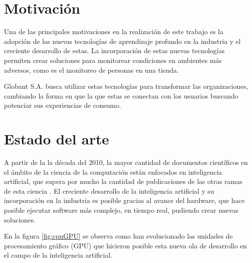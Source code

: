 

\section{Motivación}
\label{sec:motivacion}

Una de las principales motivaciones en la realización de este trabajo es la adopción de las nuevas tecnologías de aprendizaje profundo en la industria y el  creciente desarrollo de estas. La incorporación de estas nuevas tecnologías permiten crear soluciones para monitorear condiciones en ambientes más adversos, como es el monitoreo de personas en una tienda.

Globant S.A. busca utilizar estas tecnologías para transformar las organizaciones, cambiando la forma en que la que estas se conectan con los usuarios buscando potenciar sus experiencias de consumo.

\newpage


\section{Estado del arte}
\label{sec:estadoDelArte}

A partir de la la década del 2010, la mayor cantidad de documentos científicos en el ámbito de la ciencia de la computación están enfocados en inteligencia artificial, que supera por mucho la cantidad de publicaciones de las otras ramas de esta ciencia \citep{AI_PAPERS}. El creciente desarrollo de la inteligencia artificial y su incorporación en la industria es posible gracias al avance del hardware, que hace posible ejecutar software más complejo, en tiempo real, pudiendo crear nuevas soluciones.

En la figura \ref{fig:cpuGPU} se observa como han evolucionado las unidades de procesamiento gráfico (GPU) que hicieron posible esta nueva ola de desarrollo en el campo de la inteligencia artificial.

